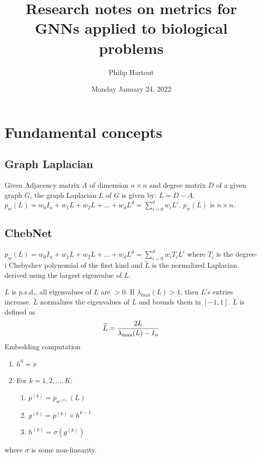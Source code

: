 \documentclass[12pt]{article}
\author{Philip Hartout}
\date{Monday January 24, 2022}
\title{Research notes on metrics for GNNs applied to biological problems}
\begin{document}
\maketitle
\section{Fundamental concepts}
\label{sec:orga260b27}
\subsection{Graph Laplacian}
\label{sec:org2fa1245}
Given Adjacency matrix \(A\) of dimension \(n\times n\) and degree matrix \(D\) of
a given graph \(G\), the graph Laplacian \(L\) of \(G\) is given by:
\(L=D-A\).
\(p_w(L)=w_0I_n+w_1L+w_2L+\dots+w_dL^d=\sum_{i=0}^{d}w_iL^i\). \(p_w(L)\) is \(n\times n\).
\subsection{ChebNet}
\label{sec:org84e9368}
\(p_w(L)=w_0I_n+w_1L+w_2L+\dots+w_dL^d=\sum_{i=0}^{d}w_iT_iL^i\)
where \(T_i\) is the degree-i Chebyshev polynomial of the first kind and
\(\widetilde{L}\) is the normalized Laplacian derived using the largest
eigenvalue of \(L\).

\(L\) is p.s.d., all eigenvalues of \(L\) are \(>0\). If \(\lambda_{\max}(L)>1\),
then \(L\)'s entries increase. \(\widetilde{L}\) normalizes the eigenvalues of \(L\)
and bounds them in \([-1,1]\). \(\widetilde{L}\) is defined as
\begin{equation*}
\widetilde{L} = {2L\over\lambda_{\max}(L) - I_n}
\end{equation*}
Embedding computation
\begin{enumerate}
\item \(h^{0}=x\)
\item For \(k=1,2,\dots,K\):
\begin{enumerate}
\item \(p^{(k)}=p_{w^{(k)}}(L)\)
\item \(g^{(k)}=p^{(k)}\times h^{k-1}\)
\item \(h^{(k)} = \sigma(g^{(k)})\)
\end{enumerate}
\end{enumerate}
where \(\sigma\) is some non-linearity.
\end{document}
